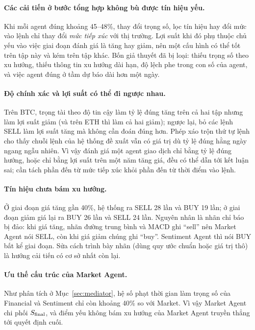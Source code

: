 \paragraph{Các cải tiến ở bước tổng hợp không bù được tín hiệu yếu.} Khi mỗi agent đúng khoảng 45--48\%, thay đổi trọng
số, lọc tín hiệu hay đổi mức vào lệnh chỉ thay đổi \emph{mức tiếp xúc} với thị trường. Lợi suất khi đó phụ thuộc chủ yếu
vào việc giai đoạn đánh giá là tăng hay giảm, nên một cấu hình có thể tốt trên tập này và kém trên tập khác. Bốn giả
thuyết đã bị loại: thiếu trọng số theo xu hướng, thiếu thông tin xu hướng dài hạn, độ lệch phe trong con số của agent, và
việc agent đúng ở tầm dự báo dài hơn một ngày.

\paragraph{Độ chính xác và lợi suất có thể đi ngược nhau.} Trên BTC, trọng tài theo độ tin cậy làm tỷ lệ đúng tăng trên
cả hai tập nhưng làm lợi suất giảm (và trên ETH thì làm cả hai giảm); ngược lại, bỏ các lệnh SELL làm lợi suất tăng mà
không cần đoán đúng hơn.
Phép xáo trộn thứ tự lệnh cho thấy chuỗi lệnh của hệ thống đề xuất vẫn có giá trị dù tỷ lệ đúng hằng ngày ngang ngẫu
nhiên. Vì vậy đánh giá một agent giao dịch chỉ bằng tỷ lệ đúng hướng, hoặc chỉ bằng lợi suất trên một năm tăng giá, đều
có thể dẫn tới kết luận sai; cần tách phần đến từ mức tiếp xúc khỏi phần đến từ thời điểm vào lệnh.

\paragraph{Tín hiệu chưa bám xu hướng.} Ở giai đoạn giá tăng gần 40\%, hệ thống ra SELL 28 lần và BUY 19 lần; ở giai
đoạn giảm giá lại ra BUY 26 lần và SELL 24 lần. Nguyên nhân là nhãn chỉ báo bị đảo: khi giá tăng, nhãn đường trung bình
và MACD ghi ``sell'' nên Market Agent nói SELL, còn khi giá giảm chúng ghi ``buy''. Sentiment Agent thì nói BUY bất kể
giai đoạn. Sửa cách trình bày nhãn (dùng quy ước chuẩn hoặc giá trị thô) là hướng cải tiến có cơ sở nhất còn lại.

\paragraph{Ưu thế cấu trúc của Market Agent.} Như phân tích ở Mục~\ref{sec:mediator}, hệ số phạt thời gian làm trọng số
của Financial và Sentiment chỉ còn khoảng 40\% so với Market. Vì vậy Market Agent chi phối $S_{\text{final}}$, và điểm yếu không
bám xu hướng của Market Agent truyền thẳng tới quyết định cuối.

